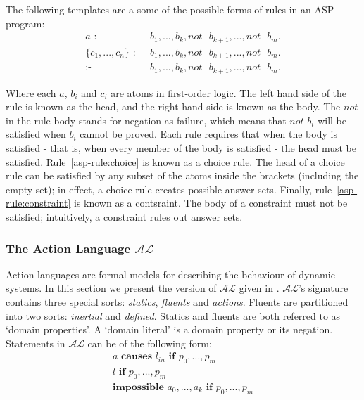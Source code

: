 \documentclass[../interim.tex]{subfiles}
\begin{document}
The following templates are a some of the possible forms of rules in an ASP program:
\begin{align}
  a \text{ :- }& b_1, ..., b_k, not \text{ } b_{k+1}, ..., not \text{ } b_m. \label{asp-rule:normal}\\
  \{c_1,...,c_n\} \text{ :- }& b_1,...,b_k, not \text{ } b_{k+1}, ..., not \text{ } b_m. \label{asp-rule:choice}\\
  \text{:- }& b_1,...,b_k, not \text{ } b_{k+1}, ..., not \text{ } b_m. \label{asp-rule:constraint}
\end{align}

Where each $a$, $b_i$ and $c_i$ are atoms in first-order logic. The left hand side of the rule is known as the head, and the right hand side is known as the body. The $not$ in the rule body stands for negation-as-failure, which means that $not$ $b_i$ will be satisfied when $b_i$ cannot be proved. Each rule requires that when the body is satisfied - that is, when every member of the body is satisfied - the head must be satisfied. Rule~\ref{asp-rule:choice} is known as a choice rule. The head of a choice rule can be satisfied by any subset of the atoms inside the brackets (including the empty set); in effect, a choice rule creates possible answer sets. Finally, rule~\ref{asp-rule:constraint} is known as a contsraint. The body of a constraint must not be satisfied; intuitively, a constraint rules out answer sets.

\subsubsection{The Action Language $\mathcal{AL}$}

Action languages are formal models for describing the behaviour of dynamic systems. In this section we present the version of $\mathcal{AL}$ given in \cite{krr-asp-book}. $\mathcal{AL}$'s signature contains three special sorts: \textit{statics}, \textit{fluents} and \textit{actions}. Fluents are partitioned into two sorts: \textit{inertial} and \textit{defined}. Statics and fluents are both referred to as `domain properties'. A `domain literal' is a domain property or its negation. Statements in $\mathcal{AL}$ can be of the following form:
\begin{gather}
  a \textbf{ causes } l_{in} \textbf{ if } p_0,...,p_m \label{al:causal} \\
  l \textbf{ if } p_0,...,p_m \label{al:constraint} \\
  \textbf{impossible } a_0,...,a_k \textbf{ if } p_0,...,p_m \label{al:exec}
\end{gather}
\end{document}
